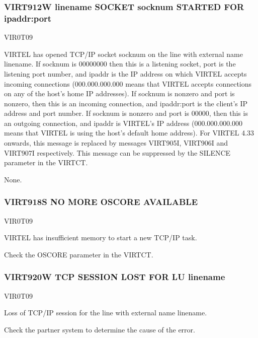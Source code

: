 \documentclass[letterpaper,10pt,english]{sphinxmanual}
\begin{document}
\subsubsection{VIRT912W linename SOCKET socknum STARTED FOR ipaddr:port}
\label{\detokenize{messages:virt912w-linename-socket-socknum-started-for-ipaddr-port}}\begin{description}
\sphinxAtStartPar
VIR0T09

\sphinxAtStartPar
VIRTEL has opened TCP/IP socket socknum on the line with external name linename. If socknum is 00000000 then this is a listening socket, port is the listening port number, and ipaddr is the IP address on which VIRTEL accepts incoming connections (000.000.000.000 means that VIRTEL accepts connections on any of the host’s home IP addresses). If socknum is non\sphinxhyphen{}zero and port is non\sphinxhyphen{}zero, then this is an incoming connection, and ipaddr:port is the client’s IP address and port number. If socknum is non\sphinxhyphen{}zero and port is 00000, then this is an outgoing connection, and ipaddr is VIRTEL’s  IP address (000.000.000.000 means that VIRTEL is using the host’s default home address).  For VIRTEL 4.33 onwards, this message is replaced by messages VIRT905I, VIRT906I and VIRT907I respectively. This message can be suppressed by the SILENCE parameter in the VIRTCT.

\sphinxAtStartPar
None.

\end{description}


\subsubsection{VIRT918S NO MORE OSCORE AVAILABLE}
\label{\detokenize{messages:virt918s-no-more-oscore-available}}\begin{description}
\sphinxAtStartPar
VIR0T09

\sphinxAtStartPar
VIRTEL has insufficient memory to start a new TCP/IP task.

\sphinxAtStartPar
Check the OSCORE parameter in the VIRTCT.

\end{description}


\subsubsection{VIRT920W TCP SESSION LOST FOR LU linename}
\label{\detokenize{messages:virt920w-tcp-session-lost-for-lu-linename}}\begin{description}
\sphinxAtStartPar
VIR0T09

\sphinxAtStartPar
Loss of TCP/IP session for the line with external name linename.

\sphinxAtStartPar
Check the partner system to determine the cause of the error.

\end{description}
\end{document}
